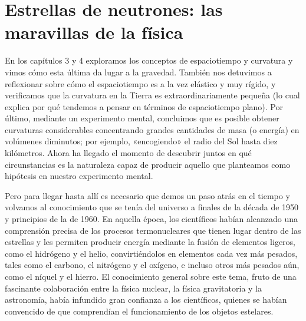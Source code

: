 \chapter[Estrellas de neutrones]{Estrellas de neutrones: las maravillas de la física}\label{ch:05}

En los capítulos 3 y 4 exploramos los conceptos de espaciotiempo y curvatura y vimos cómo esta última da lugar a la gravedad. También nos detuvimos a reflexionar sobre cómo el espaciotiempo es a la vez elástico y muy rígido, y verificamos que la curvatura en la Tierra es extraordinariamente pequeña (lo cual explica por qué tendemos a pensar en términos de espaciotiempo plano). Por último, mediante un experimento mental, concluimos que es posible obtener curvaturas considerables concentrando grandes cantidades de masa (o energía) en volúmenes diminutos; por ejemplo, «encogiendo» el radio del Sol hasta diez kilómetros. Ahora ha llegado el momento de descubrir juntos en qué circunstancias es la naturaleza capaz de producir aquello que planteamos como hipótesis en nuestro experimento mental.

Pero para llegar hasta allí es necesario que demos un paso atrás en el tiempo y volvamos al conocimiento que se tenía del universo a finales de la década de 1950 y principios de la de 1960. En aquella época, los científicos habían alcanzado una comprensión precisa de los procesos termonucleares que tienen lugar dentro de las estrellas y les permiten producir energía mediante la fusión de elementos ligeros, como el hidrógeno y el helio, convirtiéndolos en elementos cada vez más pesados, tales como el carbono, el nitrógeno y el oxígeno, e incluso otros más pesados aún, como el níquel y el hierro. El conocimiento general sobre este tema, fruto de una fascinante colaboración entre la física nuclear, la física gravitatoria y la astronomía, había infundido gran confianza a los científicos, quienes se habían convencido de que comprendían el funcionamiento de los objetos estelares.

